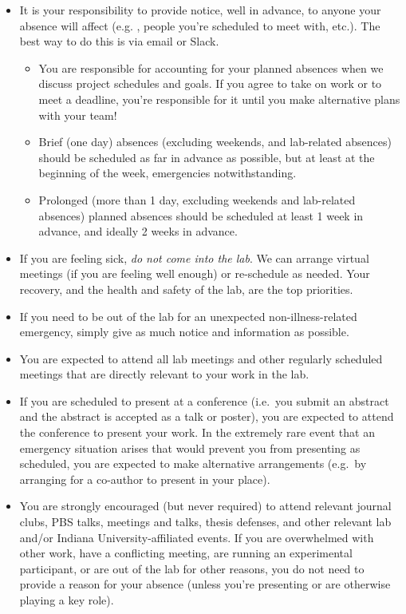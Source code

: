 \documentclass{tufte-book} %
\begin{document}
\begin{itemize}
\item It is your responsibility to provide notice, well in advance, to anyone your absence will affect (e.g. \director, people you're scheduled to meet with, etc.). The best way to do this is via email or Slack.
\begin{itemize}
\item You are responsible for accounting for your planned absences when we discuss project schedules and goals. If you agree to take on work or to meet a deadline, you're responsible for it until you make alternative plans with your team!
\item Brief (one day) absences (excluding weekends, and lab-related absences) should be scheduled as far in advance as possible, but at
least at the beginning of the week, emergencies notwithstanding.
\item Prolonged (more than 1 day, excluding weekends and lab-related absences) planned absences should be scheduled at least 1 week in advance, and ideally 2 weeks in advance.
\end{itemize}

\item If you are feeling sick, \textit{do not come into the lab}. We can arrange virtual meetings (if you are feeling well enough) or re-schedule as needed. Your recovery, and the health and safety of the lab, are the top priorities.

\item If you need to be out of the lab for an unexpected non-illness-related emergency, simply give as much notice and information as possible.

\item You are expected to attend all lab meetings and other regularly scheduled meetings that are directly relevant to your work in the lab.

\item If you are scheduled to present at a conference (i.e.\ you submit an abstract and the abstract is accepted as a talk or poster), you are expected to attend the conference to present your work. In the extremely rare event that an emergency situation arises that would prevent you from presenting as scheduled, you are expected to make alternative arrangements (e.g.\ by arranging for a co-author to present in your place).

\item You are strongly encouraged (but never required) to attend relevant journal clubs, PBS talks, meetings and talks, thesis defenses, and other relevant lab and/or Indiana University-affiliated events. If you are overwhelmed with other work, have a conflicting meeting, are running an experimental participant, or are out of the lab for other reasons, you do not need to provide a reason for your absence (unless you're presenting or are otherwise playing a key role).
\end{itemize}
\end{document}
